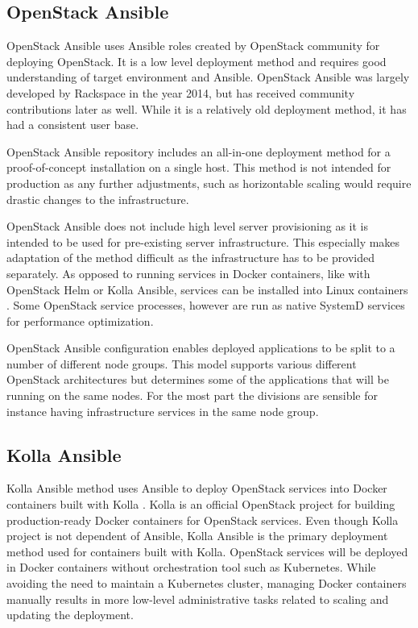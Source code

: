 \subsection{OpenStack Ansible}

OpenStack Ansible \cite{openstack-ansible} uses Ansible roles created by
OpenStack community for deploying OpenStack. It is a low level deployment
method and requires good understanding of target environment and Ansible.
OpenStack Ansible was largely developed by Rackspace in the year 2014, but has
received community contributions later as well. While it is a relatively old
deployment method, it has had a consistent user base.

OpenStack Ansible repository includes an all-in-one deployment method for a
proof-of-concept installation on a single host. This method is not intended for
production as any further adjustments, such as horizontable scaling would
require drastic changes to the infrastructure.

OpenStack Ansible does not include high level server provisioning as it is
intended to be used for pre-existing server infrastructure. This especially
makes adaptation of the method difficult as the infrastructure has to be
provided separately. As opposed to running services in Docker containers, like
with OpenStack Helm or Kolla Ansible, services can be installed into Linux
containers \cite{linuxcontainers}. Some OpenStack service processes, however
are run as native SystemD services for performance optimization.

OpenStack Ansible configuration enables deployed applications to be split to a
number of different node groups. This model supports various different
OpenStack architectures but determines some of the applications that will be
running on the same nodes. For the most part the divisions are sensible for
instance having infrastructure services in the same node group.

\subsection{Kolla Ansible}

Kolla Ansible \cite{kolla-ansible} method uses Ansible to deploy OpenStack
services into Docker containers built with Kolla \cite{kolla}. Kolla is an
official OpenStack project for building production-ready Docker containers for
OpenStack services. Even though Kolla project is not dependent of Ansible,
Kolla Ansible is the primary deployment method used for containers built with
Kolla. OpenStack services will be deployed in Docker containers without
orchestration tool such as Kubernetes. While avoiding the need to maintain a
Kubernetes cluster, managing Docker containers manually results in more
low-level administrative tasks related to scaling and updating the deployment.

